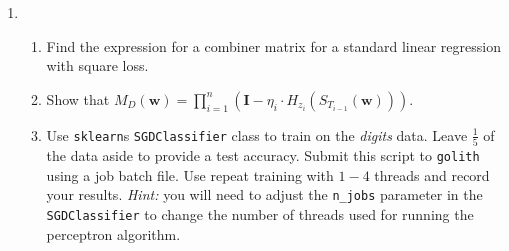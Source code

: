 \begin{enumerate}
    \item \begin{enumerate}
        \item Find the expression for a combiner matrix for a standard linear regression with square loss.
        \item Show that $M_{D} (\bm{w}) = \prod_{i=1}^{n} \left( \bm{I} - \eta_{i} \cdot H_{z_{i}} \left( S_{T_{i-1}} \left( \bm{w} \right) \right) \right)$.
        \item Use \texttt{sklearn}s \texttt{SGDClassifier} class to train on the \textit{digits} data. Leave $\frac{1}{5}$ of the data aside to provide a test accuracy. Submit this script to \texttt{golith} using a job batch file. Use repeat training with $1-4$ threads and record your results. {\it Hint:} you will need to adjust the \texttt{n\_jobs} parameter in the \texttt{SGDClassifier} to change the number of threads used for running the perceptron algorithm.
    \end{enumerate}
\end{enumerate}